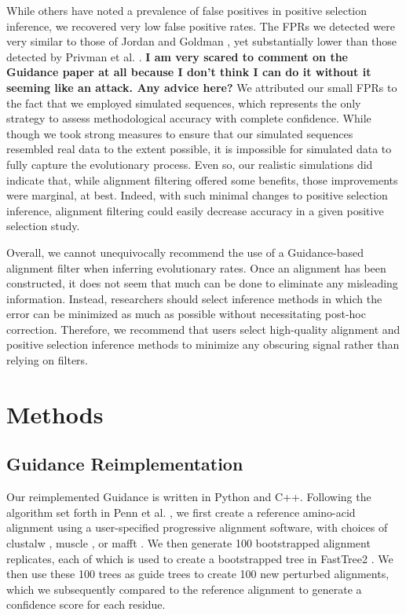 \documentclass[10pt]{article}
\begin{document}
While others have noted a prevalence of false positives in positive selection inference, we recovered very low false positive rates. The FPRs we detected were very similar to those of Jordan and Goldman \citet{Jordan2011}, yet substantially lower than those detected by Privman et al. \citet{Privman2012}. \textbf{I am very scared to comment on the Guidance paper at all because I don't think I can do it without it seeming like an attack. Any advice here?} We attributed our small FPRs to the fact that we employed simulated sequences, which represents the only strategy to assess methodological accuracy with complete confidence. While though we took strong measures to ensure that our simulated sequences resembled real data to the extent possible, it is impossible for simulated data to fully capture the evolutionary process. Even so, our realistic simulations did indicate that, while alignment filtering offered some benefits, those improvements were marginal, at best. Indeed, with such minimal changes to positive selection inference, alignment filtering could easily decrease accuracy in a given positive selection study.  

Overall, we cannot unequivocally recommend the use of a Guidance-based alignment filter when inferring evolutionary rates. Once an alignment has been constructed, it does not seem that much can be done to eliminate any misleading information. Instead, researchers should select inference methods in which the error can be minimized as much as possible without necessitating post-hoc correction. Therefore, we recommend that users select high-quality alignment and positive selection inference methods to minimize any obscuring signal rather than relying on filters.


\section*{Methods}

\subsection*{Guidance Reimplementation}
Our reimplemented Guidance is written in Python and C++. Following the algorithm set forth in Penn et al. \citep{Penn2010}, we first create a reference amino-acid alignment using a user-specified progressive alignment software, with choices of clustalw \citep{Thompson1994}, muscle \citep{Edgar2004}, or mafft \citep{Katoh2002, Katoh2005}. We then generate 100 bootstrapped alignment replicates, each of which is used to create a bootstrapped tree in FastTree2 \citep{Price2010}. We then use these 100 trees as guide trees to create 100 new perturbed alignments, which we subsequently compared to the reference alignment to generate a confidence score for each residue.
\end{document}
